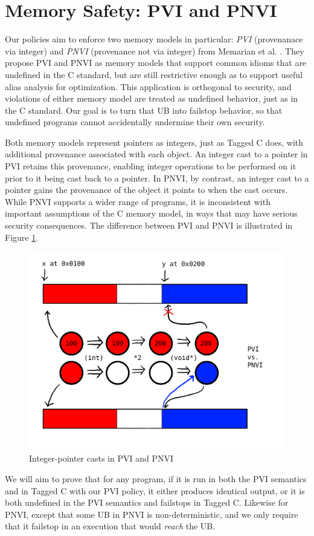 \documentclass{article}
\begin{document}
\section{Memory Safety: PVI and PNVI}

Our policies aim to enforce two memory models in particular: {\it PVI} (provenanace via integer) and
{\it PNVI} (provenance not via integer) from Memarian et al. \cite{???}. They propose PVI and PNVI
as memory models that support common idioms that are undefined in the C standard, but are still restrictive
enough as to support useful alias analysis for optimization. This application is orthogonal to
security, and violations of either memory model are treated as undefined behavior, just as in the
C standard. Our goal is to turn that UB into failstop behavior, so that undefined programs cannot accidentally
undermine their own security.

Both memory models represent pointers as integers, just as Tagged C does, with additional provenance
associated with each object. An integer cast to a pointer in PVI retains this provenance, enabling
integer operations to be performed on it prior to it being cast back to a pointer.
In PNVI, by contrast, an integer cast to a pointer gains the provenance of the object it points
to when the cast occurs. While PNVI supports a wider range of programs, it is inconsistent with important
assumptions of the C memory model, in ways that may have serious security consequences.
The difference between PVI and PNVI is illustrated in Figure \ref{fig:PVI-PNVI}.

\begin{figure}
  \includegraphics[width=.6\textwidth]{PVIvsPNVI.png}
  \caption{Integer-pointer casts in PVI and PNVI}
  \label{fig:PVI-PNVI}
\end{figure}

We will aim to prove that for any program, if it is run in both the PVI semantics
and in Tagged C with our PVI policy, it either produces identical output, or it is both
undefined in the PVI semantics and failstops in Tagged C. Likewise for PNVI, except that
some UB in PNVI is non-deterministic, and we only require that it failstop in an execution
that would {\it reach} the UB.
\end{document}

